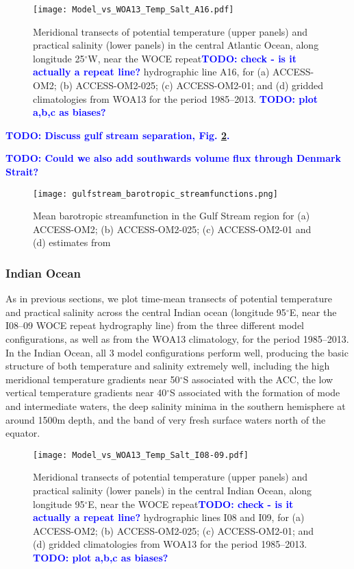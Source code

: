 \documentclass[gmd, manuscript]{copernicus}
\newcommand{\TODO}[1]{\textcolor{blue}{\textsf{\textbf{TODO: #1}}}}
\begin{document}
\begin{figure}[t]
\texttt{[image: Model\_vs\_WOA13\_Temp\_Salt\_A16.pdf]}
\caption{Meridional transects of potential temperature (upper panels) and practical salinity (lower panels) in the central Atlantic Ocean, along longitude 25$^{\circ}$W, near the WOCE repeat\TODO{check - is it actually a repeat line?} hydrographic line A16, for (a)  ACCESS-OM2; (b) ACCESS-OM2-025; (c) ACCESS-OM2-01;  and (d) gridded climatologies from WOA13 for the period 1985--2013. 
\TODO{plot a,b,c as biases?}
\label{fig:Transect_Atlantic}}
\end{figure}

\TODO{Discuss gulf stream separation, Fig. \ref{fig:GulfStream_clim}.}

\TODO{Could we also add southwards volume flux through Denmark Strait?}

\begin{figure}[t]
\texttt{[image: gulfstream\_barotropic\_streamfunctions.png]}
\caption{Mean barotropic streamfunction in the Gulf Stream region for (a)  ACCESS-OM2; (b) ACCESS-OM2-025; (c) ACCESS-OM2-01 and (d) estimates from \citep{cdvo:2016} \label{fig:GulfStream_clim}}
\end{figure}

\clearpage

\subsubsection{Indian Ocean}

As in previous sections, we plot time-mean transects of potential temperature and practical salinity across the central Indian ocean (longitude 95$^{\circ}$E, near the I08--09 WOCE repeat hydrography line) from the three different model configurations, as well as from the WOA13 climatology, for the period 1985--2013. In the Indian Ocean, all 3 model configurations perform well, producing the basic structure of both temperature and salinity extremely well, including the high meridional temperature gradients near 50$^{\circ}$S associated with the ACC, the low vertical temperature gradients near 40$^\circ$S associated with the formation of mode and intermediate waters, the deep salinity minima in the southern hemisphere at around 1500m depth, and the band of very fresh surface waters north of the equator.  

\begin{figure}[t]
\texttt{[image: Model\_vs\_WOA13\_Temp\_Salt\_I08-09.pdf]}
\caption{Meridional transects of potential temperature (upper panels) and practical salinity (lower panels) in the central Indian Ocean, along longitude 95$^{\circ}$E, near the WOCE repeat\TODO{check - is it actually a repeat line?} hydrographic lines I08 and I09, for (a)  ACCESS-OM2; (b) ACCESS-OM2-025; (c) ACCESS-OM2-01;  and (d) gridded climatologies from WOA13 for the period 1985--2013.
\TODO{plot a,b,c as biases?}
 \label{fig:Transect_Indian}}
\end{figure}
\end{document}
